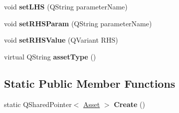 \begin{DoxyCompactItemize}
\item 
\hypertarget{class_picto_1_1_predicate_expression_a6ce6c9f9984c257be7baaebbb871dafc}{void {\bfseries set\-L\-H\-S} (Q\-String parameter\-Name)}\label{class_picto_1_1_predicate_expression_a6ce6c9f9984c257be7baaebbb871dafc}

\item 
\hypertarget{class_picto_1_1_predicate_expression_a5719bcf6af39fbe3a59eb1b3b489a5af}{void {\bfseries set\-R\-H\-S\-Param} (Q\-String parameter\-Name)}\label{class_picto_1_1_predicate_expression_a5719bcf6af39fbe3a59eb1b3b489a5af}

\item 
\hypertarget{class_picto_1_1_predicate_expression_a55bb371069c3d1465a27a29746d25023}{void {\bfseries set\-R\-H\-S\-Value} (Q\-Variant R\-H\-S)}\label{class_picto_1_1_predicate_expression_a55bb371069c3d1465a27a29746d25023}

\item 
\hypertarget{class_picto_1_1_predicate_expression_acd97d7b3ca1b01ca4cc0ad62b4042eb1}{virtual Q\-String {\bfseries asset\-Type} ()}\label{class_picto_1_1_predicate_expression_acd97d7b3ca1b01ca4cc0ad62b4042eb1}

\end{DoxyCompactItemize}
\subsection*{Static Public Member Functions}
\begin{DoxyCompactItemize}
\item 
\hypertarget{class_picto_1_1_predicate_expression_ae38d607c2bcf56683e4beb9a5f1f052d}{static Q\-Shared\-Pointer$<$ \hyperlink{class_picto_1_1_asset}{Asset} $>$ {\bfseries Create} ()}\label{class_picto_1_1_predicate_expression_ae38d607c2bcf56683e4beb9a5f1f052d}

\end{DoxyCompactItemize}
